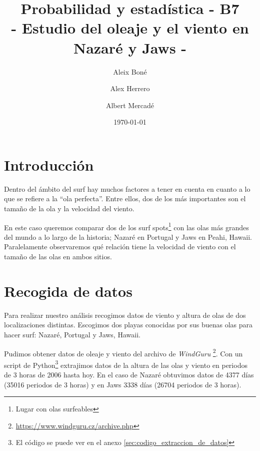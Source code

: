 


\title{
   Probabilidad y estadística - B7 \\
   \large 
   - Estudio del oleaje y el viento en Nazaré y Jaws -
}
\author{
  Aleix Boné \and
  Alex Herrero \and
  Albert Mercadé
}
\date{
  \today
}


\maketitle

\begin{abstract}
\end{abstract}

\section{Introducción}%
\label{sec:introduccion}
Dentro del ámbito del surf hay muchos factores a tener en cuenta en cuanto  a lo que se refiere a la ``ola perfecta''. Entre ellos, dos de los más importantes son el tamaño de la ola y la velocidad del viento.

En este caso queremos comparar dos de los surf spots\footnote{Lugar con olas surfeables} con las olas más grandes del mundo a lo largo de la historia; Nazaré en Portugal y Jaws en Peahi, Hawaii. Paralelamente observaremos qué relación tiene la velocidad de viento con el tamaño de las olas en ambos sitios.

\section{Recogida de datos}%
\label{sec:recogida_de_datos}

Para realizar nuestro análisis recogimos datos de viento y altura de olas de
dos localizaciones distintas. Escogimos dos playas conocidas por sus buenas
olas para hacer surf: Nazaré, Portugal y Jaws, Hawaii.

Pudimos obtener datos de oleaje y viento del archivo de \emph{WindGuru}
\footnote{\url{https://www.windguru.cz/archive.php}}. Con un script de
Python\footnote{El código se puede ver en el anexo
  \ref{sec:codigo_extraccion_de_datos}} extrajimos datos de la altura de las
olas y viento en periodos de 3 horas de 2006 hasta hoy. En el caso de Nazaré
obtuvimos datos de 4377 días (35016 periodos de 3 horas) y en Jaws 3338 días
(26704 periodos de 3 horas).

